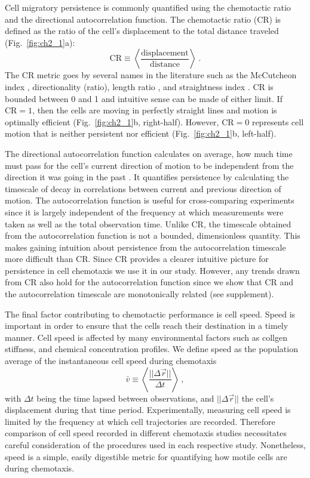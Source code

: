 Cell migratory persistence is commonly quantified using the chemotactic ratio and the directional autocorrelation function. The chemotactic ratio (CR) is defined as the ratio of the cell's displacement to the total distance traveled (Fig.\ \ref{fig:ch2_1}a):
\begin{equation}
    \text{CR} \equiv  \left\langle \frac{\text{displacement}}{\text{distance}} \right\rangle \ .
\end{equation}
The CR metric goes by several names in the literature such as the McCutcheon index \cite{mccutcheon1946chemotaxis}, directionality (ratio), length ratio \cite{gorelik2014quantitative}, and straightness index \cite{codling2008random}.
CR is bounded between 0 and 1 and intuitive sense can be made of either limit. If $\text{CR} = 1$, then the cells are moving in perfectly straight lines and motion is optimally efficient (Fig.\ \ref{fig:ch2_1}b, right-half). However, $\text{CR} = 0$ represents cell motion that is neither persistent nor efficient (Fig.\ \ref{fig:ch2_1}b, left-half).

The directional autocorrelation function calculates on average, how much time must pass for the cell's current direction of motion to be independent from the direction it was going in the past \red{[CITE]}. It quantifies persistence by calculating the timescale of decay in correlations between current and previous direction of motion. The autocorrelation function is useful for cross-comparing experiments since it is largely independent of the frequency at which measurements were taken as well as the total observation time. Unlike CR, the timescale obtained from the autocorrelation function is not a bounded, dimensionless quantity. This makes gaining intuition about persistence from the autocorrelation timescale more difficult than CR. Since CR provides a clearer intuitive picture for persistence in cell chemotaxis we use it in our study. However, any trends drawn from CR also hold for the autocorrelation function since we show that CR and the autocorrelation timescale are monotonically related (see supplement).

The final factor contributing to chemotactic performance is cell speed. Speed is important in order to ensure that the cells reach their destination in a timely manner. Cell speed is affected by many environmental factors such as collgen stiffness, and chemical concentration profiles. We define speed as the population average of the instantaneous cell speed during chemotaxis
\begin{equation}
    \bar{v} \equiv \left\langle \frac{||\Delta\vec{r}||}{\Delta t} \right\rangle \ ,
\end{equation}
with $\Delta t$ being the time lapsed between observations, and $||\Delta\vec{r}||$ the cell's displacement during that time period.
Experimentally, measuring cell speed is limited by the frequency at which cell trajectories are recorded. Therefore comparison of cell speed recorded in different chemotaxis studies necessitates careful consideration of the procedures used in each respective study. Nonetheless, speed is a simple, easily digestible metric for quantifying how motile cells are during chemotaxis.


